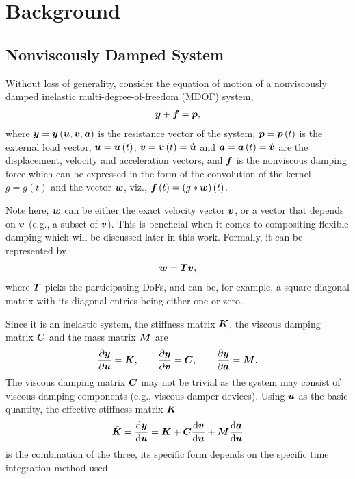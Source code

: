 \section{Background}
\subsection{Nonviscously Damped System}
Without loss of generality, consider the equation of motion of a nonviscously damped inelastic multi-degree-of-freedom (MDOF) system,
\begin{gather}\label{eq:eom}
\bm{y}+\bm{f}=\bm{p},
\end{gather}
where $\bm{y}=\bm{y}\left(\bm{u},\bm{v},\bm{a}\right)$ is the resistance vector of the system, $\bm{p}=\bm{p}\left(t\right)$ is the external load vector, $\bm{u}=\bm{u}\left(t\right)$, $\bm{v}=\bm{v}\left(t\right)=\dot{\bm{u}}$ and $\bm{a}=\bm{a}\left(t\right)=\dot{\bm{v}}$ are the displacement, velocity and acceleration vectors, and $\bm{f}$ is the nonviscous damping force which can be expressed in the form of the convolution of the kernel $g=g\left(t\right)$ and the vector $\bm{w}$, viz., $\bm{f}\left(t\right)=\left(g*\bm{w}\right)\left(t\right)$.

Note here, $\bm{w}$ can be either the exact velocity vector $\bm{v}$, or a vector that depends on $\bm{v}$ (e.g., a subset of $\bm{v}$). This is beneficial when it comes to compositing flexible damping which will be discussed later in this work. Formally, it can be represented by
\begin{gather}
\bm{w}=\bm{T}\bm{v},
\end{gather}
where $\bm{T}$ picks the participating DoFs, and can be, for example, a square diagonal matrix with its diagonal entries being either one or zero.

Since it is an inelastic system, the stiffness matrix $\bm{K}$, the viscous damping matrix $\bm{C}$ and the mass matrix $\bm{M}$ are
\begin{gather}
\dfrac{\partial{\bm{y}}}{\partial{\bm{u}}}=\bm{K},\qquad
\dfrac{\partial{\bm{y}}}{\partial{\bm{v}}}=\bm{C},\qquad
\dfrac{\partial{\bm{y}}}{\partial{\bm{a}}}=\bm{M}.
\end{gather}
The viscous damping matrix $\bm{C}$ may not be trivial as the system may consist of viscous damping components (e.g., viscous damper devices). Using $\bm{u}$ as the basic quantity, the effective stiffness matrix $\bar{\bm{K}}$
\begin{gather}
\bar{\bm{K}}=\dfrac{\mathrm{d}\bm{y}}{\mathrm{d}\bm{u}}=\bm{K}+\bm{C}\dfrac{\mathrm{d}\bm{v}}{\mathrm{d}\bm{u}}+\bm{M}\dfrac{\mathrm{d}\bm{a}}{\mathrm{d}\bm{u}}
\end{gather}
is the combination of the three, its specific form depends on the specific time integration method used.
